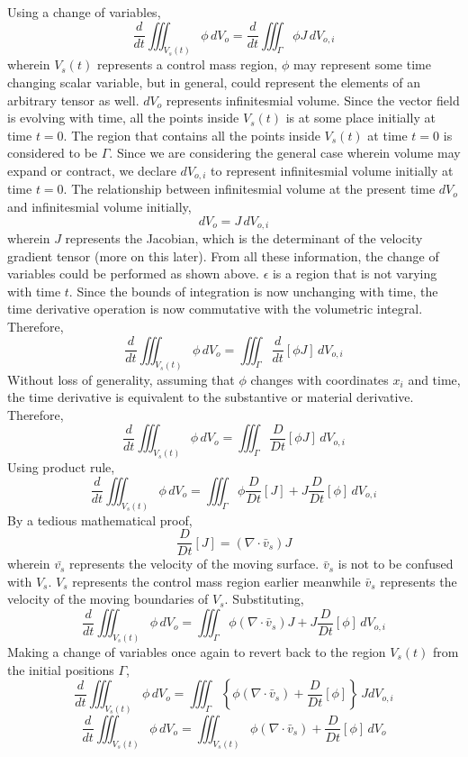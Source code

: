 \documentclass[a4paper, 12pt]{report}
\begin{document}
\begin{center}
Using a change of variables,
$$\frac{d}{dt}\iiint^{}_{V_{s}(t)}\phi \,dV_{o} = \frac{d}{dt}\iiint^{}_{\Gamma} \phi J \,dV_{o,i}$$
wherein $V_{s}(t)$ represents a control mass region, $\phi$ may represent some time changing scalar variable, but in general, could represent the elements of an arbitrary tensor as well. $dV_{o}$ represents infinitesmial volume. Since the vector field is evolving with time, all the points inside $V_{s}(t)$ is at some place initially at time $t = 0$. The region that contains all the points inside $V_{s}(t)$ at time $t = 0$ is considered to be $\Gamma$. Since we are considering the general case wherein volume may expand or contract, we declare $dV_{o,i} $ to represent infinitesmial volume initially at time $t = 0$. The relationship between infinitesmial volume at the present time $dV_{o}$ and infinitesmial volume initially,
$$dV_{o} = J\,dV_{o,i}$$
wherein $J$ represents the Jacobian, which is the determinant of the velocity gradient tensor (more on this later). From all these information, the change of variables could be performed as shown above. $\epsilon$ is a region that is not varying with time $t$. Since the bounds of integration is now unchanging with time, the time derivative operation is now commutative with the volumetric integral. Therefore,
$$\frac{d}{dt}\iiint^{}_{V_{s}(t)}\phi \,dV_{o} = \iiint^{}_{\Gamma}\frac{d}{dt}[\phi J] \,dV_{o,i}$$
Without loss of generality, assuming that $\phi$ changes with coordinates $x_{i}$ and time, the time derivative is equivalent to the substantive or material derivative. Therefore,
$$\frac{d}{dt}\iiint^{}_{V_{s}(t)}\phi \,dV_{o} = \iiint^{}_{\Gamma}\frac{D}{Dt}[\phi J] \,dV_{o,i}$$
Using product rule,
$$\frac{d}{dt}\iiint^{}_{V_{s}(t)}\phi \,dV_{o} = \iiint^{}_{\Gamma}\phi\frac{D}{Dt}[J] + J\frac{D}{Dt}[\phi] \,dV_{o,i}$$
By a tedious mathematical proof,
$$\frac{D}{Dt}[J] = (\nabla \cdot\bar{v}_{s})J$$
wherein $\bar{v_{s}}$ represents the velocity of the moving surface. $\bar{v}_{s}$ is not to be confused with $V_{s}$. $V_{s}$ represents the control mass region earlier meanwhile $\bar{v}_{s}$ represents the velocity of the moving boundaries of $V_{s}$. Substituting,
$$\frac{d}{dt}\iiint^{}_{V_{s}(t)}\phi \,dV_{o} = \iiint^{}_{\Gamma}\phi(\nabla \cdot\bar{v}_{s})J + J\frac{D}{Dt}[\phi] \,dV_{o,i}$$
Making a change of variables once again to revert back to the region $V_{s}(t)$ from the initial positions $\Gamma$,
$$\frac{d}{dt}\iiint^{}_{V_{s}(t)}\phi \,dV_{o} = \iiint^{}_{\Gamma}\left\{\phi(\nabla \cdot\bar{v}_{s}) + \frac{D}{Dt}[\phi]\right\} \,JdV_{o,i}$$
$$\frac{d}{dt}\iiint^{}_{V_{s}(t)}\phi \,dV_{o} = \iiint^{}_{V_{s}(t)} \phi(\nabla \cdot\bar{v}_{s}) + \frac{D}{Dt}[\phi]  \,dV_{o}$$

\end{center}
\end{document}
